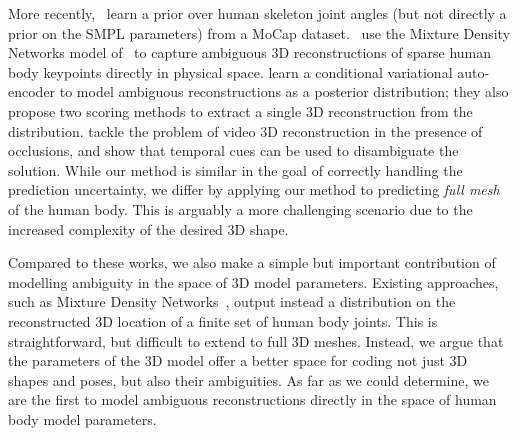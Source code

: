 
More recently,~\citet{akhter15pose-conditioned} learn a prior over human skeleton joint angles (but not directly a prior on the SMPL parameters) from a MoCap dataset.~\citet{li19generating} use the Mixture Density Networks model of~\cite{bishop94mixture} to capture ambiguous 3D reconstructions of sparse human body keypoints directly in physical space.
\citet{sharma19monocular} learn a conditional variational auto-encoder to model ambiguous reconstructions as a posterior distribution; they also propose two scoring methods to extract a single 3D reconstruction from the distribution.
\citet{cheng19occlusion-aware} tackle the problem of video 3D reconstruction in the presence of occlusions, and show that temporal cues can be used to disambiguate the solution.
While our method is similar in the goal of correctly handling the prediction uncertainty, we differ by applying our method to predicting \emph{full mesh} of the human body.
This is arguably a more challenging scenario due to the increased complexity of the desired 3D shape.

Compared to these works, we also make a simple but important contribution of modelling ambiguity in the space of 3D model parameters.
Existing approaches, such as Mixture Density Networks~\cite{bishop94mixture,li19generating}, output instead a distribution on the reconstructed 3D location of a finite set of human body joints.
This is straightforward, but difficult to extend to full 3D meshes.
Instead, we argue that the parameters of the 3D model offer a better space for coding not just 3D shapes and poses, but also their ambiguities.
As far as we could determine, we are the first to model ambiguous reconstructions directly in the space of human body model parameters.





